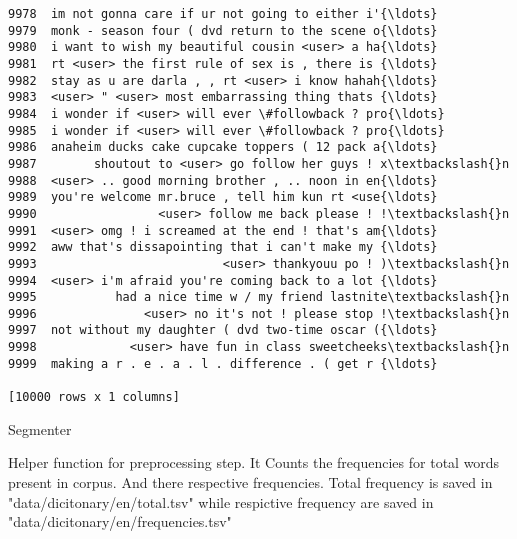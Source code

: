 \documentclass[11pt]{article}
\begin{document}
\begin{Verbatim}[commandchars=\\\{\}]
9978  im not gonna care if ur not going to either i'{\ldots}
9979  monk - season four ( dvd return to the scene o{\ldots}
9980  i want to wish my beautiful cousin <user> a ha{\ldots}
9981  rt <user> the first rule of sex is , there is {\ldots}
9982  stay as u are darla , , rt <user> i know hahah{\ldots}
9983  <user> " <user> most embarrassing thing thats {\ldots}
9984  i wonder if <user> will ever \#followback ? pro{\ldots}
9985  i wonder if <user> will ever \#followback ? pro{\ldots}
9986  anaheim ducks cake cupcake toppers ( 12 pack a{\ldots}
9987        shoutout to <user> go follow her guys ! x\textbackslash{}n
9988  <user> .. good morning brother , .. noon in en{\ldots}
9989  you're welcome mr.bruce , tell him kun rt <use{\ldots}
9990                 <user> follow me back please ! !\textbackslash{}n
9991  <user> omg ! i screamed at the end ! that's am{\ldots}
9992  aww that's dissapointing that i can't make my {\ldots}
9993                          <user> thankyouu po ! )\textbackslash{}n
9994  <user> i'm afraid you're coming back to a lot {\ldots}
9995           had a nice time w / my friend lastnite\textbackslash{}n
9996               <user> no it's not ! please stop !\textbackslash{}n
9997  not without my daughter ( dvd two-time oscar ({\ldots}
9998             <user> have fun in class sweetcheeks\textbackslash{}n
9999  making a r . e . a . l . difference . ( get r {\ldots}

[10000 rows x 1 columns]

    \end{Verbatim}

    Segmenter

Helper function for preprocessing step. It Counts the frequencies for
total words present in corpus. And there respective frequencies. Total
frequency is saved in {"data/dicitonary/en/total.tsv"} while respictive
frequency are saved in {"data/dicitonary/en/frequencies.tsv"}
\end{document}
